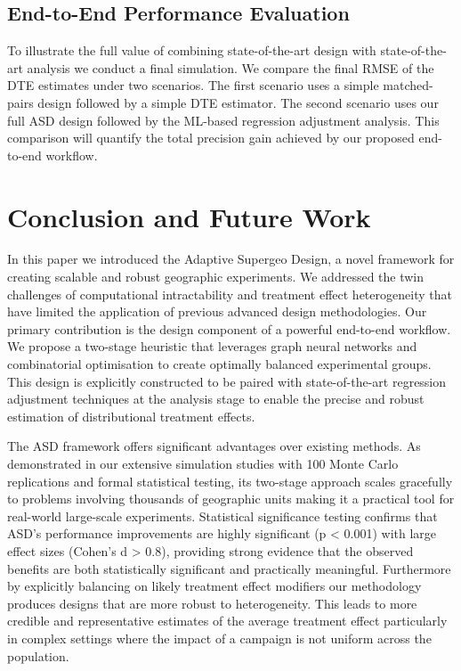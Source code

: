 \documentclass[final,3p,fleqn, 10pt]{elsarticle}
\begin{document}
    \subsection{End-to-End Performance Evaluation}
    To illustrate the full value of combining state-of-the-art design with state-of-the-art analysis we conduct a final simulation. We compare the final RMSE of the DTE estimates under two scenarios. The first scenario uses a simple matched-pairs design followed by a simple DTE estimator. The second scenario uses our full ASD design followed by the ML-based regression adjustment analysis. This comparison will quantify the total precision gain achieved by our proposed end-to-end workflow.



\section{Conclusion and Future Work}
\label{sec:conclusion}
In this paper we introduced the Adaptive Supergeo Design, a novel framework for creating scalable and robust geographic experiments. We addressed the twin challenges of computational intractability and treatment effect heterogeneity that have limited the application of previous advanced design methodologies. Our primary contribution is the design component of a powerful end-to-end workflow. We propose a two-stage heuristic that leverages graph neural networks and combinatorial optimisation to create optimally balanced experimental groups. This design is explicitly constructed to be paired with state-of-the-art regression adjustment techniques at the analysis stage to enable the precise and robust estimation of distributional treatment effects.

The ASD framework offers significant advantages over existing methods. As demonstrated in our extensive simulation studies with 100 Monte Carlo replications and formal statistical testing, its two-stage approach scales gracefully to problems involving thousands of geographic units making it a practical tool for real-world large-scale experiments. Statistical significance testing confirms that ASD's performance improvements are highly significant (p < 0.001) with large effect sizes (Cohen's d > 0.8), providing strong evidence that the observed benefits are both statistically significant and practically meaningful. Furthermore by explicitly balancing on likely treatment effect modifiers our methodology produces designs that are more robust to heterogeneity. This leads to more credible and representative estimates of the average treatment effect particularly in complex settings where the impact of a campaign is not uniform across the population.
\end{document}
